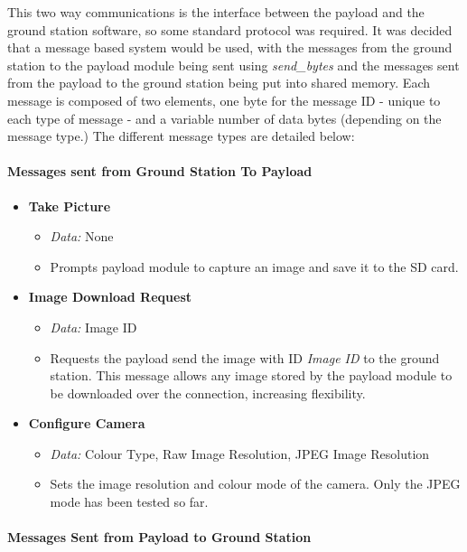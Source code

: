 This two way communications is the interface between the payload and the 
ground station software, so some standard protocol was required. It was decided
that a message based system would be used, with the messages from the ground
station to the payload module being sent using \emph{send\_bytes} and the 
messages sent from the payload to the ground station being put into shared
memory. Each message is composed of two elements, one byte for the message ID 
- unique to each type of message - and a variable number of data bytes 
(depending on the message type.) The different message types are detailed 
below:

\paragraph{Messages sent from Ground Station To Payload}

\begin{itemize}
\item \textbf{Take Picture}
\begin{itemize}
\item \emph{Data:} None
\item Prompts payload module to capture an image and save it to the SD card.
\end{itemize}

\item \textbf{Image Download Request} 
\begin{itemize}

\item \emph{Data:} Image ID
\item Requests the payload send the image with ID \emph{Image ID} to the 
ground station. This message allows any image stored by the payload module 
to be downloaded over the connection, increasing flexibility. 
\end{itemize}

\item \textbf{Configure Camera}
\begin{itemize}
\item \emph{Data:} Colour Type, Raw Image Resolution, JPEG Image
Resolution
\item Sets the image resolution and colour mode of the camera. Only the 
JPEG mode has been tested so far.
\end{itemize}

\end{itemize}

\paragraph{Messages Sent from Payload to Ground Station}

